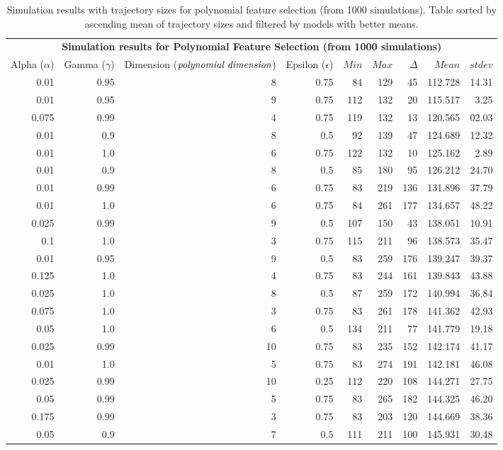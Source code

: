 \documentclass[10pt,twocolumn]{article}
\begin{document}
\begin{table}\centering
  \begin{tabular}{@{}rrrr|rrrrr@{}}\toprule
  \multicolumn{9}{c}{\textbf{Simulation results for Polynomial Feature Selection (from 1000 simulations)}}\\
  Alpha ($\alpha$) & Gamma ($\gamma$) & Dimension ($\emph{polynomial dimension}$) & Epsilon ($\epsilon$) & $Min$ & $Max$ & $\Delta$ & $Mean$ & $stdev$\\
  0.01 & 0.95 & 8 & 0.75 & 84 & 129 & 45 & 112.728 & 14.31\\
  0.01 & 0.95 & 9 & 0.75 & 112 & 132 & 20 & 115.517 & 3.25\\
  0.075 & 0.99 & 4 & 0.75 & 119 & 132 & 13 & 120.565 & 02.03\\
  0.01 & 0.9 & 8 & 0.5 & 92 & 139 & 47 & 124.689 & 12.32\\
  0.01 & 1.0 & 6 & 0.75 & 122 & 132 & 10 & 125.162 & 2.89\\
  0.01 & 0.9 & 8 & 0.5 & 85 & 180 & 95 & 126.212 & 24.70\\
  0.01 & 0.99 & 6 & 0.75 & 83 & 219 & 136 & 131.896 & 37.79\\
  0.01 & 1.0 & 6 & 0.75 & 84 & 261 & 177 & 134.657 & 48.22\\
  0.025 & 0.99 & 9 & 0.5 & 107 & 150 & 43 & 138.051 & 10.91\\
  0.1 & 1.0 & 3 & 0.75 & 115 & 211 & 96 & 138.573 & 35.47\\
  0.01 & 0.95 & 9 & 0.5 & 83 & 259 & 176 & 139.247 & 39.37\\
  0.125 & 1.0 & 4 & 0.75 & 83 & 244 & 161 & 139.843 & 43.88\\
  0.025 & 1.0 & 8 & 0.5 & 87 & 259 & 172 & 140.994 & 36.84\\
  0.075 & 1.0 & 3 & 0.75 & 83 & 261 & 178 & 141.362 & 42.93\\
  0.05 & 1.0 & 6 & 0.5 & 134 & 211 & 77 & 141.779 & 19.18\\
  0.025 & 0.99 & 10 & 0.75 & 83 & 235 & 152 & 142.174 & 41.17\\
  0.01 & 1.0 & 5 & 0.75 & 83 & 274 & 191 & 142.181 & 46.08\\
  0.025 & 0.99 & 10 & 0.25 & 112 & 220 & 108 & 144.271 & 27.75\\
  0.05 & 0.99 & 5 & 0.75 & 83 & 265 & 182 & 144.325 & 46.20\\
  0.175 & 0.99 & 3 & 0.75 & 83 & 203 & 120 & 144.669 & 38.36\\
  0.05 & 0.9 & 7 & 0.5 & 111 & 211 & 100 & 145.931 & 30.48\\
  \bottomrule
  \end{tabular}
  \caption{Simulation results with trajectory sizes for polynomial feature selection (from 1000 simulations). Table sorted by ascending mean of trajectory sizes and filtered by models with better means. }
  \label{polynomial-simulation-result}
\end{table}
\end{document}
